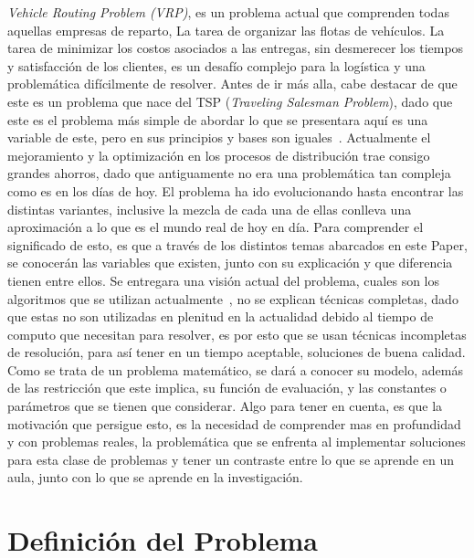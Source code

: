 \documentclass[letter, 10pt]{article}
\begin{document}
\emph{Vehicle Routing Problem (VRP)}, es un problema actual que comprenden todas aquellas empresas de reparto, La tarea de organizar las flotas
de veh\'iculos. La tarea de minimizar los costos asociados a las entregas, sin desmerecer los tiempos y satisfacci\'on de los clientes, es un desaf\'io
complejo para la log\'istica y una problem\'atica dif\'icilmente de resolver.
\newline
Antes de ir m\'as alla, cabe destacar de que este es un problema que nace del TSP (\emph{Traveling Salesman Problem}), dado que este es el problema
m\'as simple de abordar lo que se presentara aqu\'i es una variable de este, pero en sus principios y bases son iguales~\cite{TSP}.
\newline
Actualmente el mejoramiento y la optimizaci\'on en los procesos de distribuci\'on trae consigo grandes ahorros, dado que antiguamente no era una
problem\'atica tan compleja como es en los d\'ias de hoy. El problema ha ido evolucionando hasta encontrar las distintas variantes, inclusive la 
mezcla de cada una de ellas conlleva una aproximaci\'on a lo que es el mundo real de hoy en d\'ia. Para comprender el significado de esto,
es que a trav\'es de los distintos temas abarcados en este Paper, se conocer\'an las variables que existen, junto con su explicaci\'on y que diferencia
tienen entre ellos. Se entregara una visi\'on actual del problema, cuales son los algoritmos que se utilizan actualmente~\cite{Prosser93Hybrid}, no se explican t\'ecnicas 
completas, dado que estas no son utilizadas en plenitud en la actualidad debido al tiempo de computo que necesitan para resolver, es por esto que se usan 
t\'ecnicas incompletas de resoluci\'on, para as\'i tener en un tiempo aceptable, soluciones de buena calidad.
Como se trata de un problema matem\'atico, se dar\'a a conocer su modelo, adem\'as de las restricci\'on que este implica, su funci\'on de evaluaci\'on,
y las constantes o par\'ametros que se tienen que considerar.
\newline
Algo para tener en cuenta, es que la motivaci\'on que persigue esto, es la necesidad de comprender mas en profundidad y con problemas reales, la 
problem\'atica que se enfrenta al implementar soluciones para esta clase de problemas y tener un contraste entre lo que se aprende en un aula, junto
con lo que se aprende en la investigaci\'on.

\section{Definici\'on del Problema}
\end{document}

